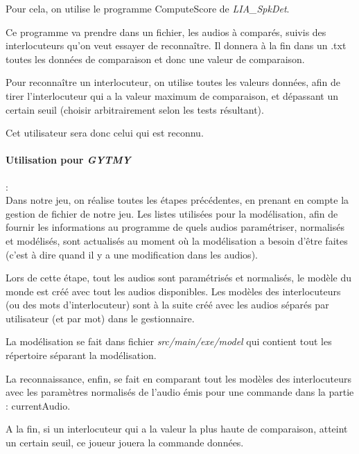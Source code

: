 Pour cela, on utilise le programme ComputeScore de \textit{LIA\_SpkDet}.

Ce programme va prendre dans un fichier, les audios à comparés, suivis des interlocuteurs qu'on veut essayer de reconnaître. Il donnera à la fin dans un .txt toutes les données de comparaison et donc une valeur de comparaison.

Pour reconnaître un interlocuteur, on utilise toutes les valeurs données, afin de tirer l'interlocuteur qui a la valeur maximum de comparaison, et dépassant
un certain seuil (choisir arbitrairement selon les tests résultant).

Cet utilisateur sera donc celui qui est reconnu.


\paragraph*{Utilisation pour \textit{GYTMY}} : \\
Dans notre jeu, on réalise toutes les étapes précédentes, en prenant en compte la gestion de fichier de notre jeu. Les listes utilisées pour la modélisation,
afin de fournir les informations au programme de quels audios paramétriser, normalisés et modélisés, sont actualisés au moment où la modélisation a besoin
d'être faites (c'est à dire quand il y a une modification dans les audios).

Lors de cette étape, tout les audios sont paramétrisés et normalisés, le modèle du monde est créé avec tout les audios disponibles.
Les modèles des interlocuteurs (ou des mots d'interlocuteur) sont à la suite créé avec les audios séparés par utilisateur (et par mot) dans le gestionnaire.

La modélisation se fait dans fichier \textit{ src/main/exe/model} qui contient tout les répertoire séparant la modélisation.

La reconnaissance, enfin, se fait en comparant tout les modèles des interlocuteurs avec les paramètres normalisés de l'audio émis pour une commande dans la partie : currentAudio.

A la fin, si un interlocuteur qui a la valeur la plus haute de comparaison, atteint un certain seuil, ce joueur jouera la commande données.

